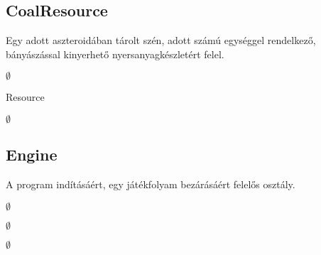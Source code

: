 \subsection{CoalResource}
\begin{class-template-responsibility}
Egy adott aszteroidában tárolt szén, adott számú egységgel rendelkező, bányászással kinyerhető nyersanyagkészletért felel. 
\end{class-template-responsibility}
\begin{class-template-interface}
$\emptyset$
\end{class-template-interface}
\begin{class-template-baseclass}
Resource
\end{class-template-baseclass}
\begin{class-template-attribute}
\item[] $\emptyset$
\end{class-template-attribute}
\begin{class-template-method}
\end{class-template-method}


\subsection{Engine}
\begin{class-template-responsibility}
A program indításáért, egy játékfolyam bezárásáért felelős osztály. 
\end{class-template-responsibility}
\begin{class-template-interface}
$\emptyset$
\end{class-template-interface}
\begin{class-template-baseclass}
$\emptyset$
\end{class-template-baseclass}
\begin{class-template-attribute}
\item[] $\emptyset$
\end{class-template-attribute}
\begin{class-template-method}
\end{class-template-method}


